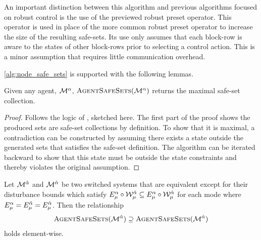 \begin{remark}
An important distinction between this algorithm and previous algorithms focused on robust control is the use of the previewed robust preset operator. This operator is used in place of the more common robust preset operator to increase the size of the resulting safe-sets. Its use only assumes that each block-row is aware to the states of other block-rows prior to selecting a control action. This is a minor assumption that requires little communication overhead.
\end{remark}
\autoref{alg:node_safe_sets} is supported with the following lemmas. 
\begin{lemma}\label{lemma:maximal_proof}
Given any agent, $\mathcal{M}^{\alpha}$, $\Call{AgentSafeSets}{\agent{\agentidx}}$ returns the maximal safe-set collection.
\end{lemma}
\begin{proof}
Follows the logic of \cite[Theorem 2]{Danielson2019}, sketched here. The first part of the proof shows the produced sets are safe-set collections by definition. To show that it is maximal, a contradiction can be constructed by assuming there exists a state outside the generated sets that satisfies the safe-set definition. The algorithm can be iterated backward to show that this state must be outside the state constraints and thereby violates the original assumption.
\end{proof}
\begin{lemma}
Let $\mathcal{M}^{\tilde{\alpha}}$ and $\mathcal{M}^{\hat{\alpha}}$ be two switched systems that are equivalent except for their disturbance bounds which satisfy $E_{{\mu}}^{\alpha}\circ\mathcal{W}^{\tilde{\alpha}}_{\mu}\subseteq E_{{\mu}}^{\alpha}\circ\mathcal{W}^{\hat{\alpha}}_{\mu}$ for each mode where $E_{{\mu}}^{\alpha}=E_{{\mu}}^{\tilde{\alpha}}=E_{{\mu}}^{\hat{\alpha}}$. Then the relationship
$$\Call{AgentSafeSets}{\agent{\tilde\agentidx}}\supseteq\Call{AgentSafeSets}{\agent{\hat\agentidx}}$$
 holds element-wise. 
\end{lemma}
